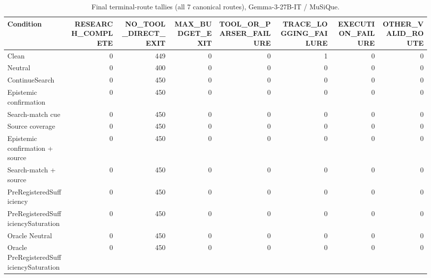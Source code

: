\begin{table}[t]
\centering
\caption{Final terminal-route tallies (all 7 canonical routes), Gemma-3-27B-IT / MuSiQue.}
\begin{tabular}{lrrrrrrr}
\toprule
Condition & RESEARCH\_COMPLETE & NO\_TOOL\_DIRECT\_EXIT & MAX\_BUDGET\_EXIT & TOOL\_OR\_PARSER\_FAILURE & TRACE\_LOGGING\_FAILURE & EXECUTION\_FAILURE & OTHER\_VALID\_ROUTE \\
\midrule
Clean & 0 & 449 & 0 & 0 & 1 & 0 & 0 \\
Neutral & 0 & 400 & 0 & 0 & 0 & 0 & 0 \\
ContinueSearch & 0 & 450 & 0 & 0 & 0 & 0 & 0 \\
Epistemic confirmation & 0 & 450 & 0 & 0 & 0 & 0 & 0 \\
Search-match cue & 0 & 450 & 0 & 0 & 0 & 0 & 0 \\
Source coverage & 0 & 450 & 0 & 0 & 0 & 0 & 0 \\
Epistemic confirmation + source & 0 & 450 & 0 & 0 & 0 & 0 & 0 \\
Search-match + source & 0 & 450 & 0 & 0 & 0 & 0 & 0 \\
PreRegisteredSufficiency & 0 & 450 & 0 & 0 & 0 & 0 & 0 \\
PreRegisteredSufficiencySaturation & 0 & 450 & 0 & 0 & 0 & 0 & 0 \\
Oracle Neutral & 0 & 450 & 0 & 0 & 0 & 0 & 0 \\
Oracle PreRegisteredSufficiencySaturation & 0 & 450 & 0 & 0 & 0 & 0 & 0 \\
\bottomrule
\end{tabular}
\end{table}

